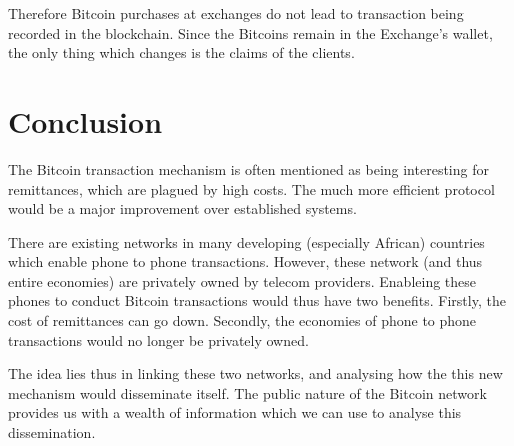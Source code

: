 \begin{refsection}
Therefore Bitcoin purchases at exchanges do not lead to transaction being recorded in the blockchain.
Since the Bitcoins remain in the Exchange's wallet, the only thing which changes is the claims of the clients.

\section{Conclusion}
The Bitcoin transaction mechanism is often mentioned as being interesting for remittances, which are plagued by high costs.
The much more efficient protocol would be a major improvement over established systems.

There are existing networks in many developing (especially African) countries which enable phone to phone transactions.
However, these network (and thus entire economies) are privately owned by telecom providers.
Enableing these phones to conduct Bitcoin transactions would thus have two benefits.
Firstly, the cost of remittances can go down.
Secondly, the economies of phone to phone transactions would no longer be privately owned.

The idea lies thus in linking these two networks, and analysing how the this new mechanism would disseminate itself.
The public nature of the Bitcoin network provides us with a wealth of information which we can use to analyse this dissemination.

\printbibliography
\end{refsection}